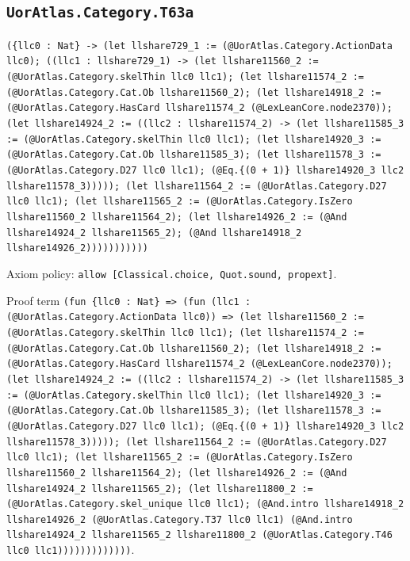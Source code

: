 \documentclass[11pt]{article}
\begin{document}
\subsection*{\texttt{UorAtlas.Category.T63a}}
\noindent\texttt{(\{llc0 : Nat\} -> (let llshare729\_1 := (@UorAtlas.Category.ActionData llc0); ((llc1 : llshare729\_1) -> (let llshare11560\_2 := (@UorAtlas.Category.skelThin llc0 llc1); (let llshare11574\_2 := (@UorAtlas.Category.Cat.Ob llshare11560\_2); (let llshare14918\_2 := (@UorAtlas.Category.HasCard llshare11574\_2 (@LexLeanCore.node2370)); (let llshare14924\_2 := ((llc2 : llshare11574\_2) -> (let llshare11585\_3 := (@UorAtlas.Category.skelThin llc0 llc1); (let llshare14920\_3 := (@UorAtlas.Category.Cat.Ob llshare11585\_3); (let llshare11578\_3 := (@UorAtlas.Category.D27 llc0 llc1); (@Eq.\{(0 + 1)\} llshare14920\_3 llc2 llshare11578\_3))))); (let llshare11564\_2 := (@UorAtlas.Category.D27 llc0 llc1); (let llshare11565\_2 := (@UorAtlas.Category.IsZero llshare11560\_2 llshare11564\_2); (let llshare14926\_2 := (@And llshare14924\_2 llshare11565\_2); (@And llshare14918\_2 llshare14926\_2)))))))))))}\par
\noindent Axiom policy: \texttt{allow [Classical.choice, Quot.sound, propext]}.\par
\noindent Proof term \texttt{(fun \{llc0 : Nat\} => (fun (llc1 : (@UorAtlas.Category.ActionData llc0)) => (let llshare11560\_2 := (@UorAtlas.Category.skelThin llc0 llc1); (let llshare11574\_2 := (@UorAtlas.Category.Cat.Ob llshare11560\_2); (let llshare14918\_2 := (@UorAtlas.Category.HasCard llshare11574\_2 (@LexLeanCore.node2370)); (let llshare14924\_2 := ((llc2 : llshare11574\_2) -> (let llshare11585\_3 := (@UorAtlas.Category.skelThin llc0 llc1); (let llshare14920\_3 := (@UorAtlas.Category.Cat.Ob llshare11585\_3); (let llshare11578\_3 := (@UorAtlas.Category.D27 llc0 llc1); (@Eq.\{(0 + 1)\} llshare14920\_3 llc2 llshare11578\_3))))); (let llshare11564\_2 := (@UorAtlas.Category.D27 llc0 llc1); (let llshare11565\_2 := (@UorAtlas.Category.IsZero llshare11560\_2 llshare11564\_2); (let llshare14926\_2 := (@And llshare14924\_2 llshare11565\_2); (let llshare11800\_2 := (@UorAtlas.Category.skel\_unique llc0 llc1); (@And.intro llshare14918\_2 llshare14926\_2 (@UorAtlas.Category.T37 llc0 llc1) (@And.intro llshare14924\_2 llshare11565\_2 llshare11800\_2 (@UorAtlas.Category.T46 llc0 llc1)))))))))))))}.\par
\end{document}
